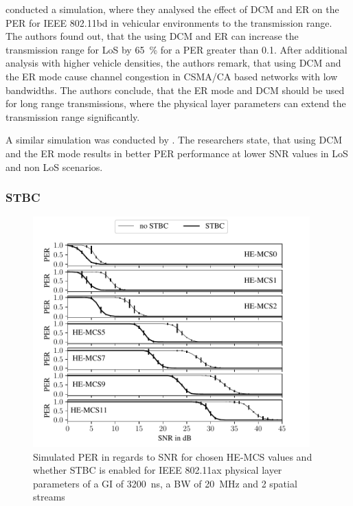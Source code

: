 \textcite{jacob_system-level_2020} conducted a simulation, where they analysed the effect of \ac{DCM} and \ac{ER} on the \ac{PER} for
IEEE 802.11bd in vehicular environments to the transmission range. The authors found out, that the using \ac{DCM} and \ac{ER} can
increase the transmission range for \ac{LoS} by \SI{65}{\percent} for a \ac{PER} greater than \num{0.1}. After additional analysis with higher
vehicle densities, the authors remark, that using \ac{DCM} and the \ac{ER} mode cause channel congestion in CSMA/CA based
networks with low bandwidths. The authors conclude, that the \ac{ER} mode and \ac{DCM} should be used for long range transmissions, where
the physical layer parameters can extend the transmission range significantly.

A similar simulation was conducted by \textcite{triwinarko_phy_2021}. The researchers state, that using \ac{DCM} and the
\ac{ER} mode results in better \ac{PER} performance at lower \ac{SNR} values in \ac{LoS} and non \ac{LoS} scenarios.

\subsubsection*{\acf{STBC}}

\begin{figure}%
	\centering
	\includegraphics[width=0.95\textwidth]{figures/STBC_PER_to_SNR.pdf}
	\caption{Simulated \ac{PER} in regards to \ac{SNR} for chosen HE-\ac{MCS} values and whether \ac{STBC} is enabled for IEEE 802.11ax physical layer parameters of a \ac{GI} of \SI{3200}{\nano\second}, a \ac{BW} of \SI{20}{\mega\hertz} and 2 spatial streams}%
	\label{fig:PER_SNR_STBC}%
\end{figure}